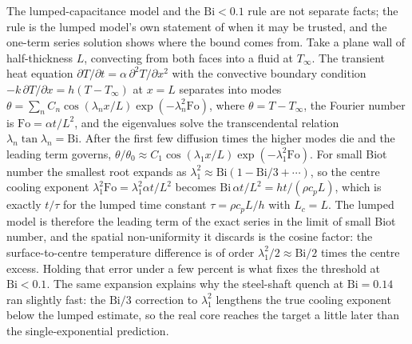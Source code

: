 \begin{mastery}
The lumped-capacitance model and the $\text{Bi} < 0.1$ rule are not
separate facts; the rule is the lumped model's own statement of when it
may be trusted, and the one-term series solution shows where the bound
comes from. Take a plane wall of half-thickness $L$, convecting from
both faces into a fluid at $T_\infty$. The transient heat equation
$\partial T/\partial t = \alpha\,\partial^2 T/\partial x^2$ with the
convective boundary condition $-k\,\partial T/\partial x = h(T - T_\infty)$
at $x = L$ separates into modes $\theta = \sum_n C_n \cos(\lambda_n x/L)
\exp(-\lambda_n^2 \text{Fo})$, where $\theta = T - T_\infty$, the Fourier
number is $\text{Fo} = \alpha t/L^2$, and the eigenvalues solve the
transcendental relation $\lambda_n \tan\lambda_n = \text{Bi}$. After the
first few diffusion times the higher modes die and the leading term
governs, $\theta/\theta_0 \approx C_1 \cos(\lambda_1 x/L)
\exp(-\lambda_1^2 \text{Fo})$. For small Biot number the smallest root
expands as $\lambda_1^2 \approx \text{Bi}(1 - \text{Bi}/3 + \cdots)$, so
the centre cooling exponent $\lambda_1^2 \text{Fo} = \lambda_1^2 \alpha
t/L^2$ becomes $\text{Bi}\,\alpha t/L^2 = h t/(\rho c_p L)$, which is
exactly $t/\tau$ for the lumped time constant $\tau = \rho c_p L/h$ with
$L_c = L$. The lumped model is therefore the leading term of the exact
series in the limit of small Biot number, and the spatial
non-uniformity it discards is the cosine factor: the surface-to-centre
temperature difference is of order $\lambda_1^2/2 \approx \text{Bi}/2$
times the centre excess. Holding that error under a few percent is what
fixes the threshold at $\text{Bi} < 0.1$. The same expansion explains why
the steel-shaft quench at $\text{Bi} = 0.14$ ran slightly fast: the
$\text{Bi}/3$ correction to $\lambda_1^2$ lengthens the true cooling
exponent below the lumped estimate, so the real core reaches the target a
little later than the single-exponential prediction.
\end{mastery}

